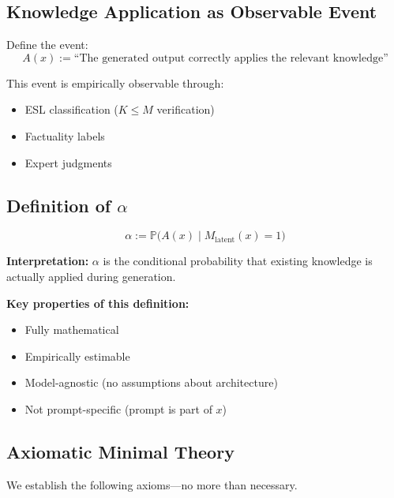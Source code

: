 \documentclass[11pt,a4paper]{article}
\begin{document}
\subsection{Knowledge Application as Observable Event}

Define the event:
\begin{equation}
A(x) := \text{``The generated output correctly applies the relevant knowledge''}
\end{equation}

This event is empirically observable through:
\begin{itemize}
    \item ESL classification ($K \leq M$ verification)
    \item Factuality labels
    \item Expert judgments
\end{itemize}

\subsection{Definition of $\alpha$}

\begin{principlebox}
\begin{equation}
\boxed{\alpha := \mathbb{P}\big( A(x) \mid M_{\text{latent}}(x) = 1 \big)}
\end{equation}

\textbf{Interpretation:} $\alpha$ is the conditional probability that existing knowledge is actually applied during generation.
\end{principlebox}

\textbf{Key properties of this definition:}
\begin{itemize}
    \item Fully mathematical
    \item Empirically estimable
    \item Model-agnostic (no assumptions about architecture)
    \item Not prompt-specific (prompt is part of $x$)
\end{itemize}


\subsection{Axiomatic Minimal Theory}

We establish the following axioms---no more than necessary.
\end{document}
